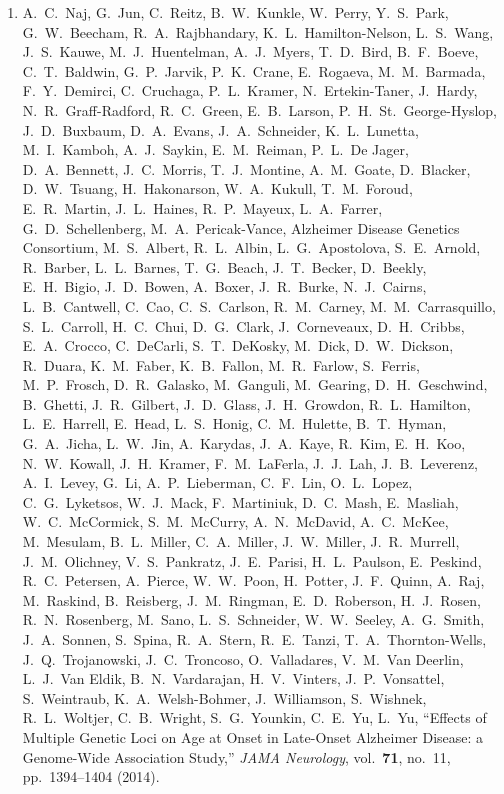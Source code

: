 \begin{enumerate}
\item A.\ C.\ Naj, G.\ Jun, C.\ Reitz, B.\ W.\ Kunkle, W.\ Perry,
  Y.\ S.\ Park, G.\ W.\ Beecham, R.\ A.\ Rajbhandary,
  K.\ L.\ Hamilton-Nelson, L.\ S.\ Wang, J.\ S.\ Kauwe,
  M.\ J.\ Huentelman, A.\ J.\ Myers, T.\ D.\ Bird, B.\ F.\ Boeve,
  C.\ T.\ Baldwin, G.\ P.\ Jarvik, P.\ K.\ Crane, E.\ Rogaeva,
  M.\ M.\ Barmada, F.\ Y.\ Demirci, C.\ Cruchaga, P.\ L.\ Kramer,
  N.\ Ertekin-Taner, J.\ Hardy, N.\ R.\ Graff-Radford, R.\ C.\ Green,
  E.\ B.\ Larson, P.\ H.\ St.\ George-Hyslop, J.\ D.\ Buxbaum,
  D.\ A.\ Evans, J.\ A.\ Schneider, K.\ L.\ Lunetta, M.\ I.\ Kamboh,
  A.\ J.\ Saykin, E.\ M.\ Reiman, P.\ L.\ De Jager, D.\ A.\ Bennett,
  J.\ C.\ Morris, T.\ J.\ Montine, A.\ M.\ Goate, D.\ Blacker,
  D.\ W.\ Tsuang, H.\ Hakonarson, W.\ A.\ Kukull, T.\ M.\ Foroud,
  E.\ R.\ Martin, J.\ L.\ Haines, R.\ P.\ Mayeux, L.\ A.\ Farrer,
  G.\ D.\ Schellenberg, M.\ A.\ Pericak-Vance, Alzheimer Disease
  Genetics Consortium, M.\ S.\ Albert, R.\ L.\ Albin,
  L.\ G.\ Apostolova, S.\ E.\ Arnold, R.\ Barber, L.\ L.\ Barnes,
  T.\ G.\ Beach, J.\ T.\ Becker, D.\ Beekly, E.\ H.\ Bigio,
  J.\ D.\ Bowen, A.\ Boxer, J.\ R.\ Burke, N.\ J.\ Cairns,
  L.\ B.\ Cantwell, C.\ Cao, C.\ S.\ Carlson, R.\ M.\ Carney,
  M.\ M.\ Carrasquillo, S.\ L.\ Carroll, H.\ C.\ Chui, D.\ G.\ Clark,
  J.\ Corneveaux, D.\ H.\ Cribbs, E.\ A.\ Crocco, C.\ DeCarli,
  S.\ T.\ DeKosky, M.\ Dick, D.\ W.\ Dickson, R.\ Duara,
  K.\ M.\ Faber, K.\ B.\ Fallon, M.\ R.\ Farlow, S.\ Ferris,
  M.\ P.\ Frosch, D.\ R.\ Galasko, M.\ Ganguli, M.\ Gearing,
  D.\ H.\ Geschwind, B.\ Ghetti, J.\ R.\ Gilbert, J.\ D.\ Glass,
  J.\ H.\ Growdon, R.\ L.\ Hamilton, L.\ E.\ Harrell, E.\ Head,
  L.\ S.\ Honig, C.\ M.\ Hulette, B.\ T.\ Hyman, G.\ A.\ Jicha,
  L.\ W.\ Jin, A.\ Karydas, J.\ A.\ Kaye, R.\ Kim, E.\ H.\ Koo,
  N.\ W.\ Kowall, J.\ H.\ Kramer, F.\ M.\ LaFerla, J.\ J.\ Lah,
  J.\ B.\ Leverenz, A.\ I.\ Levey, G.\ Li, A.\ P.\ Lieberman,
  C.\ F.\ Lin, O.\ L.\ Lopez, C.\ G.\ Lyketsos, W.\ J.\ Mack,
  F.\ Martiniuk, D.\ C.\ Mash, E.\ Masliah, W.\ C.\ McCormick,
  S.\ M.\ McCurry, A.\ N.\ McDavid, A.\ C.\ McKee, M.\ Mesulam,
  B.\ L.\ Miller, C.\ A.\ Miller, J.\ W.\ Miller, J.\ R.\ Murrell,
  J.\ M.\ Olichney, V.\ S.\ Pankratz, J.\ E.\ Parisi, H.\ L.\ Paulson,
  E.\ Peskind, R.\ C.\ Petersen, A.\ Pierce, W.\ W.\ Poon, H.\ Potter,
  J.\ F.\ Quinn, A.\ Raj, M.\ Raskind, B.\ Reisberg, J.\ M.\ Ringman,
  E.\ D.\ Roberson, H.\ J.\ Rosen, R.\ N.\ Rosenberg, M.\ Sano,
  L.\ S.\ Schneider, W.\ W.\ Seeley, A.\ G.\ Smith, J.\ A.\ Sonnen,
  S.\ Spina, R.\ A.\ Stern, R.\ E.\ Tanzi, T.\ A.\ Thornton-Wells,
  J.\ Q.\ Trojanowski, J.\ C.\ Troncoso, O.\ Valladares, V.\ M.\ Van
  Deerlin, L.\ J.\ Van Eldik, B.\ N.\ Vardarajan, H.\ V.\ Vinters,
  J.\ P.\ Vonsattel, S.\ Weintraub, K.\ A.\ Welsh-Bohmer,
  J.\ Williamson, S.\ Wishnek, R.\ L.\ Woltjer, C.\ B.\ Wright,
  S.\ G.\ Younkin, C.\ E.\ Yu, L.\ Yu, ``Effects of Multiple Genetic
  Loci on Age at Onset in Late-Onset Alzheimer Disease: a Genome-Wide
  Association Study,'' \textit{JAMA Neurology}, vol.\ \textbf{71},
  no.\ 11, pp.\ 1394--1404 (2014).


\end{enumerate}
